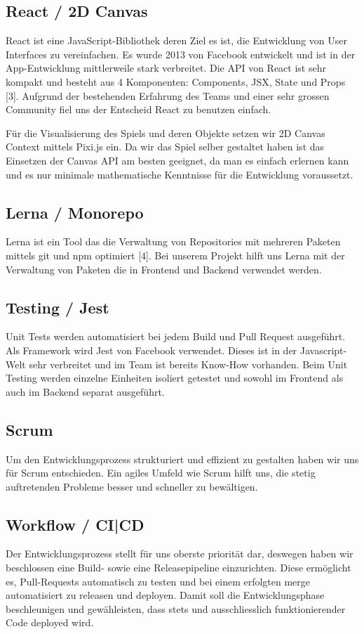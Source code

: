 \documentclass[11pt,a4paper,titlepage]{article}
\begin{document}
\subsection{React / 2D Canvas}
React ist eine JavaScript-Bibliothek deren Ziel es ist, die Entwicklung von User Interfaces zu vereinfachen. Es wurde 2013 von Facebook entwickelt und ist in der App-Entwicklung mittlerweile stark verbreitet.
Die API von React ist sehr kompakt und besteht aus 4 Komponenten: Components, JSX, State und Props [3].
Aufgrund der bestehenden Erfahrung des Teams und einer sehr grossen Community fiel uns der Entscheid React zu benutzen einfach.

Für die Visualisierung des Spiels und deren Objekte setzen wir 2D Canvas Context mittels Pixi.js ein. Da wir das Spiel selber gestaltet haben ist das Einsetzen der Canvas API am besten geeignet, da man es einfach erlernen kann und es nur minimale mathematische Kenntnisse für die Entwicklung voraussetzt.

\subsection{Lerna / Monorepo}
Lerna ist ein Tool das die Verwaltung von Repositories mit mehreren Paketen mittels git und npm optimiert [4]. Bei unserem Projekt hilft uns Lerna mit der Verwaltung von Paketen die in Frontend und Backend verwendet werden.

\subsection{Testing / Jest}
Unit Tests werden automatisiert bei jedem Build und Pull Request ausgeführt.
Als Framework wird Jest von Facebook verwendet. Dieses ist in der Javascript-Welt sehr verbreitet und im Team ist bereits Know-How vorhanden.
Beim Unit Testing werden einzelne Einheiten isoliert getestet und sowohl im Frontend als auch im Backend separat ausgeführt.

\subsection{Scrum}
Um den Entwicklungsprozess strukturiert und effizient zu gestalten haben wir uns für Scrum entschieden. Ein agiles Umfeld wie Scrum hilft uns, die stetig auftretenden Probleme besser und schneller zu bewältigen.


\subsection{Workflow / CI|CD}
Der Entwicklungsprozess stellt für uns oberste priorität dar, deswegen haben wir beschlossen eine Build- sowie eine Releasepipeline einzurichten. Diese ermöglicht es, Pull-Requests automatisch zu testen und bei einem erfolgten merge automatisiert zu releasen und deployen.
Damit soll die Entwicklungsphase beschleunigen und gewähleisten, dass stets und ausschliesslich funktionierender Code deployed wird.
\end{document}
